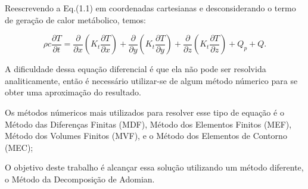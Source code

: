 
  Reescrevendo a Eq.(1.1) em coordenadas cartesianas e desconsiderando o termo de geração de calor metábolico, temos:



  \begin{equation}\rho c\frac{\partial T}{\partial t} = \frac{\partial }{\partial x} \left (K_{t}\frac{\partial T}{\partial x}\right ) + \frac{\partial }{\partial y} \left(K_{t}\frac{\partial T}{\partial y}\right ) + \frac{\partial }{\partial z} \left (K_{t}\frac{\partial T}{\partial z}\right ) + Q_{p} + Q.\end{equation}
  
   A dificuldade dessa equação diferencial é que ela não pode ser resolvida analiticamente, então é necessário utilizar-se de algum método númerico para se obter uma aproximação do resultado.
   
   Os métodos númericos mais utilizados para resolver esse tipo de equação é o Método das Diferenças Finitas (MDF), Método dos Elementos Finitos (MEF), Método dos Volumes Finitos (MVF), e o Método dos Elementos de Contorno (MEC);
   
   O objetivo deste trabalho é alcançar essa solução  utilizando um método diferente, o Método da Decomposição de Adomian.
  
  





          
              